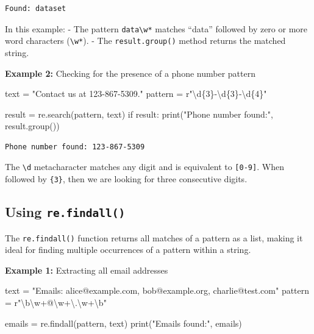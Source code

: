 \documentclass[
  letterpaper,
  DIV=11,
  numbers=noendperiod]{scrreprt}
\newenvironment{Shaded}{\begin{snugshade}}{\end{snugshade}}
\newcommand{\BuiltInTok}[1]{\textcolor[rgb]{0.00,0.23,0.31}{#1}}
\newcommand{\ControlFlowTok}[1]{\textcolor[rgb]{0.00,0.23,0.31}{#1}}
\newcommand{\NormalTok}[1]{\textcolor[rgb]{0.00,0.23,0.31}{#1}}
\newcommand{\OperatorTok}[1]{\textcolor[rgb]{0.37,0.37,0.37}{#1}}
\newcommand{\SpecialCharTok}[1]{\textcolor[rgb]{0.37,0.37,0.37}{#1}}
\newcommand{\StringTok}[1]{\textcolor[rgb]{0.13,0.47,0.30}{#1}}
\newcommand{\VerbatimStringTok}[1]{\textcolor[rgb]{0.13,0.47,0.30}{#1}}
\begin{document}
\begin{verbatim}
Found: dataset
\end{verbatim}

In this example: - The pattern \texttt{data\textbackslash{}w*} matches
``data'' followed by zero or more word characters
(\texttt{\textbackslash{}w*}). - The \texttt{result.group()} method
returns the matched string.

\textbf{Example 2:} Checking for the presence of a phone number pattern

\begin{Shaded}
\begin{Highlighting}[]
\NormalTok{text }\OperatorTok{=} \StringTok{"Contact us at 123{-}867{-}5309."}
\NormalTok{pattern }\OperatorTok{=} \VerbatimStringTok{r"\textbackslash{}d}\SpecialCharTok{\{3\}}\VerbatimStringTok{{-}\textbackslash{}d}\SpecialCharTok{\{3\}}\VerbatimStringTok{{-}\textbackslash{}d}\SpecialCharTok{\{4\}}\VerbatimStringTok{"}

\NormalTok{result }\OperatorTok{=}\NormalTok{ re.search(pattern, text)}
\ControlFlowTok{if}\NormalTok{ result:}
    \BuiltInTok{print}\NormalTok{(}\StringTok{"Phone number found:"}\NormalTok{, result.group())  }
\end{Highlighting}
\end{Shaded}

\begin{verbatim}
Phone number found: 123-867-5309
\end{verbatim}

The \texttt{\textbackslash{}d} metacharacter matches any digit and is
equivalent to \texttt{{[}0-9{]}}. When followed by \texttt{\{3\}}, then
we are looking for three consecutive digits.

\hypertarget{using-re.findall}{%
\subsection{\texorpdfstring{Using
\texttt{re.findall()}}{Using re.findall()}}\label{using-re.findall}}

The \texttt{re.findall()} function returns all matches of a pattern as a
list, making it ideal for finding multiple occurrences of a pattern
within a string.

\textbf{Example 1:} Extracting all email addresses

\begin{Shaded}
\begin{Highlighting}[]
\NormalTok{text }\OperatorTok{=} \StringTok{"Emails: alice@example.com, bob@example.org, charlie@test.com"}
\NormalTok{pattern }\OperatorTok{=} \VerbatimStringTok{r"\textbackslash{}b\textbackslash{}w+@\textbackslash{}w+\textbackslash{}.\textbackslash{}w+\textbackslash{}b"}

\NormalTok{emails }\OperatorTok{=}\NormalTok{ re.findall(pattern, text)}
\BuiltInTok{print}\NormalTok{(}\StringTok{"Emails found:"}\NormalTok{, emails)  }
\end{Highlighting}
\end{Shaded}
\end{document}
